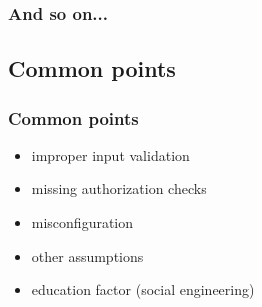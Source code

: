 \begin{frame}
\frametitle{And so on...}
\end{frame}

\subsection{Common points}

\begin{frame}
\frametitle{Common points}
\begin{itemize}
\item improper input validation
\item missing authorization checks
\item misconfiguration
\item other assumptions
\item education factor {\small (social engineering)}
\end{itemize}
\end{frame}

